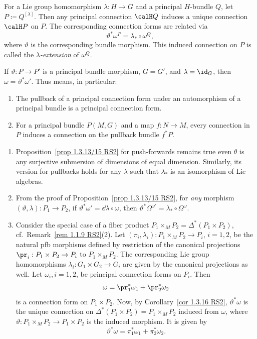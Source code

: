 \begin{cor}[{{\cite[Cor.~1.3.14]{RS2}}}]\label{cor 1.3.14 RS2}
    For a Lie group homomorphism $\lambda:H\to G$ and a principal $H$-bundle $Q$, let $P\coloneqq Q^{[\lambda]}$. Then any principal connection $\calH Q$ induces a unique connection $\calH P$ on $P$. The corresponding connection forms are related via
    \[\vartheta^\ast\omega^P=\lambda_\ast\circ \omega^Q,\]
    where $\vartheta$ is the corresponding bundle morphism. This induced connection on $P$ is called the \emph{$\lambda$-extension} of $\omega^Q$.
\end{cor}

\begin{cor}[{{\cite[Cor.~1.3.16]{RS2}}}]\label{cor 1.3.16 RS2}
    If $\vartheta:P\to P'$ is a principal bundle morphism, $G=G'$, and $\lambda=\id_G$, then $\omega=\vartheta^\ast\omega'$. Thus means, in particular:
    \begin{enumerate}
        \item The pullback of a principal connection form under an automorphism of a principal bundle is a principal connection form.
        \item For a principal bundle $P(M,G)$ and a map $f:N\to M$, every connection in $P$ induces a connection on the pullback bundle $f^\ast P$.
    \end{enumerate}
\end{cor}


\begin{rem}\label{rem 1.3.17 RS2}
    \begin{enumerate}
        \item Proposition~\ref{prop 1.3.13/15 RS2} for push-forwards remains true even $\theta$ is any surjective submersion of dimensions of equal dimension. Similarly, its version for pullbacks holds for any $\lambda$ such that $\lambda_\ast$ is an isomorphism of Lie algebras.
        \item From the proof of Proposition~\ref{prop 1.3.13/15 RS2}, for \emph{any} morphism $(\vartheta,\lambda):P_1\to P_2$, if $\vartheta^\ast \omega'=\dd\lambda\circ\omega$, then $\vartheta^\ast\Omega^{\omega'}=\lambda_\ast \circ\Omega^\omega$.
        \item Consider the special case of a fiber product $P_1\times_M P_2=\Delta^\ast(P_1\times P_2)$, cf.\ Remark~\ref{rem 1.1.9 RS2}(2). Let $(\pi_i,\lambda_i):P_1\times_M P_2\to P_i$, $i=1,2$, be the natural \gls{pfb} morphisms defined by restriction of the canonical projections $\pr_i:P_1\times P_2\to P_i$ to $P_1\times_M P_2$. The corresponding Lie group homomorphisms $\lambda_i:G_1\times G_2\to G_i$ are given by the canonical projections as well. Let $\omega_i,i=1,2$, be principal connection forms on $P_i$. Then
        \[\omega=\pr_1^\ast\omega_1+\pr_2^\ast\omega_2\]
        is a connection form on $P_1\times P_2$. Now, by Corollary~\ref{cor 1.3.16 RS2}, $\vartheta^\ast\omega$ is the unique connection on $\Delta^\ast(P_1\times P_2)=P_1\times_M P_2$ induced from $\omega$, where $\vartheta:P_1\times_M P_2\to P_1\times P_2$ is the induced morphism. It is given by
        \[\vartheta^\ast\omega=\pi_1^\ast \omega_1+\pi_2^\ast\omega_2.\label{eq 1.3.16 RS2}\]
    \end{enumerate}
\end{rem}

